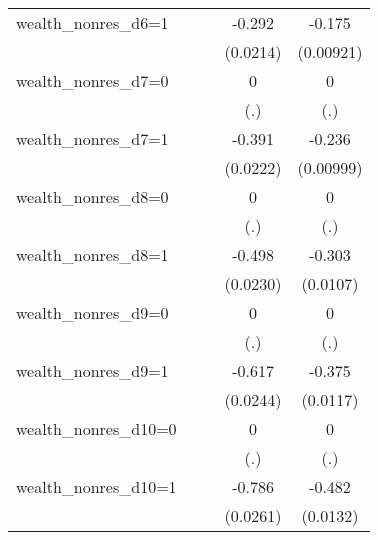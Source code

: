 \begin{table}[htbp]
\begin{tabular}{l*{4}{c}}
\addlinespace
wealth\_nonres\_d6=1&                  &                  &   -0.292\sym{***}&   -0.175\sym{***}\\
                &                  &                  & (0.0214)         &(0.00921)         \\
\addlinespace
wealth\_nonres\_d7=0&                  &                  &        0         &        0         \\
                &                  &                  &      (.)         &      (.)         \\
\addlinespace
wealth\_nonres\_d7=1&                  &                  &   -0.391\sym{***}&   -0.236\sym{***}\\
                &                  &                  & (0.0222)         &(0.00999)         \\
\addlinespace
wealth\_nonres\_d8=0&                  &                  &        0         &        0         \\
                &                  &                  &      (.)         &      (.)         \\
\addlinespace
wealth\_nonres\_d8=1&                  &                  &   -0.498\sym{***}&   -0.303\sym{***}\\
                &                  &                  & (0.0230)         & (0.0107)         \\
\addlinespace
wealth\_nonres\_d9=0&                  &                  &        0         &        0         \\
                &                  &                  &      (.)         &      (.)         \\
\addlinespace
wealth\_nonres\_d9=1&                  &                  &   -0.617\sym{***}&   -0.375\sym{***}\\
                &                  &                  & (0.0244)         & (0.0117)         \\
\addlinespace
wealth\_nonres\_d10=0&                  &                  &        0         &        0         \\
                &                  &                  &      (.)         &      (.)         \\
\addlinespace
wealth\_nonres\_d10=1&                  &                  &   -0.786\sym{***}&   -0.482\sym{***}\\
                &                  &                  & (0.0261)         & (0.0132)         \\
\midrule

\end{tabular}
\end{table}
